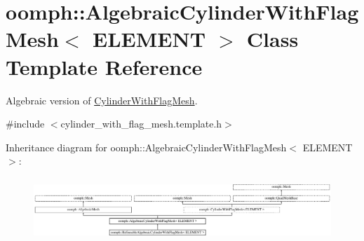 \hypertarget{classoomph_1_1AlgebraicCylinderWithFlagMesh}{}\section{oomph\+:\+:Algebraic\+Cylinder\+With\+Flag\+Mesh$<$ E\+L\+E\+M\+E\+NT $>$ Class Template Reference}
\label{classoomph_1_1AlgebraicCylinderWithFlagMesh}


Algebraic version of \hyperlink{classoomph_1_1CylinderWithFlagMesh}{Cylinder\+With\+Flag\+Mesh}.  




{\ttfamily \#include $<$cylinder\+\_\+with\+\_\+flag\+\_\+mesh.\+template.\+h$>$}

Inheritance diagram for oomph\+:\+:Algebraic\+Cylinder\+With\+Flag\+Mesh$<$ E\+L\+E\+M\+E\+NT $>$\+:\begin{figure}[H]
\begin{center}
\leavevmode
\includegraphics[height=2.405498cm]{classoomph_1_1AlgebraicCylinderWithFlagMesh}
\end{center}
\end{figure}
